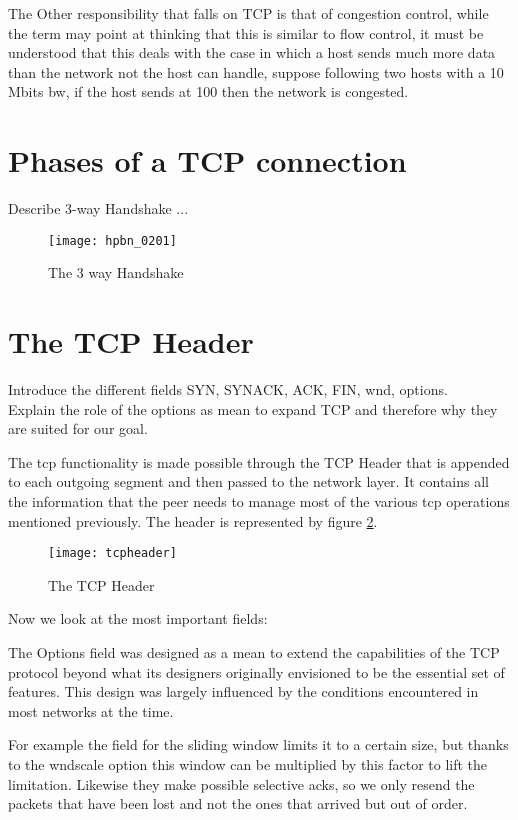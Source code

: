 \documentclass[type=bsc,accentcolor=tud9a,colorback,11pt,paper=a4report]{tudthesis}
\begin{document}
The Other responsibility that falls on TCP is that of congestion control, while 
the term may point at thinking that this is similar to flow control, it must be 
understood that this deals with the case in which a host sends much more data
than the network not the host can handle, suppose following two hosts with a 
10 Mbits bw, if the host sends at 100 then the network is congested.

\section{Phases of a TCP connection}
Describe 3-way Handshake ...
	\begin{figure}[h]
		\caption{The 3 way Handshake}
		\label{fig:handshake3w}
		\centering
		\texttt{[image: hpbn\_0201]}
	\end{figure}
	\section{The TCP Header}
Introduce the different fields SYN, SYNACK, ACK, FIN, wnd, options.\\
Explain the role of the options as mean to expand TCP and therefore why they 
are suited for our goal.

The tcp functionality is made possible through the TCP Header that is appended 
to each outgoing segment and then passed to the network layer.
It contains all the information that the peer needs to manage most of the 
various tcp operations mentioned previously. The header is represented
by figure \ref{fig:tcpheader}.

	\begin{figure}[h]
		\caption{The TCP Header}
		\label{fig:tcpheader}
		\centering
		\texttt{[image: tcpheader]}
	\end{figure}
Now we look at the most important fields:

The Options field was designed as a mean to extend the capabilities of the TCP
protocol beyond what its designers originally envisioned to be the essential set
of features. This design was largely influenced by the conditions encountered in
most networks at the time.

For example the
field for the sliding window limits it to a certain size, but thanks to the
wndscale option this window can be multiplied by this factor to lift the
limitation. Likewise they make possible selective acks, so we only resend the
packets that have been lost and not the ones that arrived but out of order.
\end{document}
